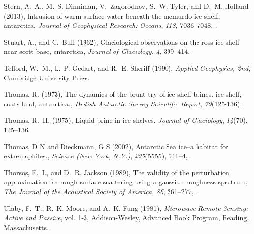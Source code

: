 \documentclass[draft,grl]{agutex}
\begin{document}
\begin{article}
\begin{thebibliography}{40}
Stern, A.~A., M.~S. Dinniman, V.~Zagorodnov, S.~W. Tyler, and D.~M. Holland
  (2013), Intrusion of warm surface water beneath the mcmurdo ice shelf,
  antarctica, \textit{Journal of Geophysical Research: Oceans}, \textit{118},
  7036--7048, .

Stuart, A., and C.~Bull (1962), Glaciological observations on the ross ice
  shelf near scott base, antarctica, \textit{Journal of Glaciology},
  \textit{4}, 399--414.

Telford, W.~M., L.~P. Gedart, and R.~E. Sheriff (1990), \textit{Applied
  Geophysics, 2nd}, Cambridge University Press.

Thomas, R. (1973), The dynamics of the brunt try of ice shelf brines. ice
  shelf, coats land, antarctica., \textit{British Antarctic Survey Scientific
  Report}, \textit{79}(125-136).

Thomas, R.~H. (1975), Liquid brine in ice shelves, \textit{Journal of
  Glaciology}, \textit{14}(70), 125--136.

{Thomas, D N and Dieckmann, G S} ({2002}), {Antarctic Sea ice--a habitat for
  extremophiles.}, \textit{{Science (New York, N.Y.)}}, \textit{{295}}({5555}),
  {641--4}, .

Thorsos, E.~I., and D.~R. Jackson (1989), The validity of the perturbation
  approximation for rough surface scattering using a gaussian roughness
  spectrum, \textit{The Journal of the Acoustical Society of America},
  \textit{86}, 261--277, .

Ulaby, F.~T., R.~K. Moore, and A.~K. Fung (1981), \textit{Microwave Remote
  Sensing: Active and Passive}, vol. 1-3, Addison-Wesley, Advanced Book
  Program, Reading, Massachusetts.

\newpage

\end{thebibliography}

%
%
\end{article}
\end{document}
